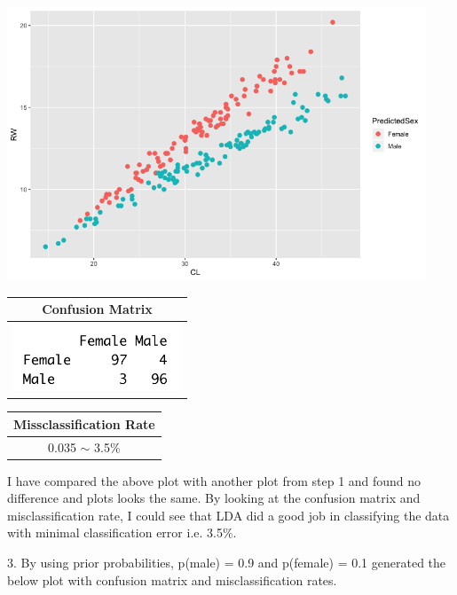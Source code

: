 \documentclass[a4paper,10pt]{article}
\begin{document}
\begin{center}
  \includegraphics[width=125mm,scale=0.10]{CL_RW_Lda_Plot_1.png} \par
  \begin{tabular}{|c|}
		\hline
    \textbf{Confusion Matrix} \\
    \hline
    \includegraphics[width=50mm,scale=0.10]{CL_RW_LDA_Confusion_Matrix_1.png} \\
    \hline
  \end{tabular}\par
  \begin{tabular}{|c|}
    \hline
    \textbf{Missclassification Rate} \\
    \hline
    0.035 $\sim$ 3.5\% \\
    \hline
  \end{tabular}
\end{center} \par
I have compared the above plot with another plot from step 1 and found no difference and plots looks the same. By
looking at the confusion matrix and misclassification rate, I could see that LDA did a good job in classifying the 
data with minimal classification error i.e. 3.5\%. \par
\vspace{0.5cm}
3. By using prior probabilities, p(male) = 0.9 and p(female) = 0.1 generated the below plot with confusion matrix and
misclassification rates.
\end{document}

